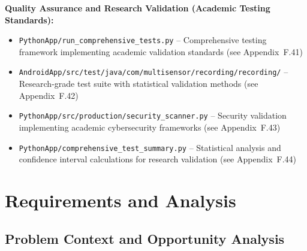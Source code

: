 \documentclass[11pt,a4paper]{report}
\begin{document}
\noindent \textbf{Quality Assurance and Research Validation (Academic Testing Standards):}\\
\begin{itemize}
\item \texttt{PythonApp/run\_comprehensive\_tests.py} – Comprehensive testing framework implementing academic validation standards (see Appendix~F.41)
\item \texttt{AndroidApp/src/test/java/com/multisensor/recording/recording/} – Research-grade test suite with statistical validation methods (see Appendix~F.42)
\item \texttt{PythonApp/src/production/security\_scanner.py} – Security validation implementing academic cybersecurity frameworks (see Appendix~F.43)
\item \texttt{PythonApp/comprehensive\_test\_summary.py} – Statistical analysis and confidence interval calculations for research validation (see Appendix~F.44)
\end{itemize}

\chapter{Requirements and Analysis}
\section{Problem Context and Opportunity Analysis}
\end{document}
